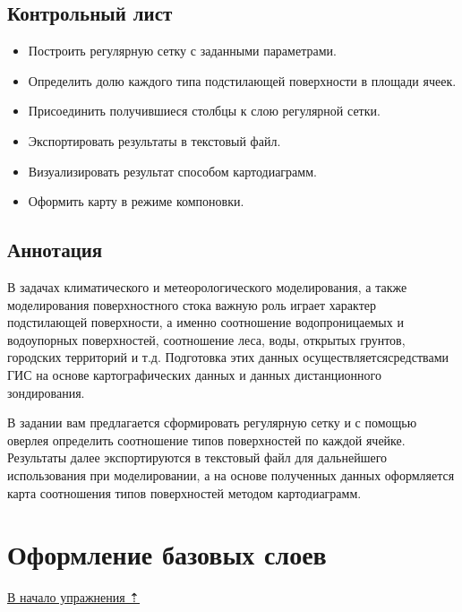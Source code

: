 \documentclass[]{book}
\providecommand{\tightlist}{%
  \setlength{\itemsep}{0pt}\setlength{\parskip}{0pt}}
\theoremstyle{definition}
\theoremstyle{definition}
\theoremstyle{definition}
\theoremstyle{remark}
\begin{document}
\hypertarget{land-cover-hydro-control}{%
\subsection{Контрольный лист}\label{land-cover-hydro-control}}

\begin{itemize}
\tightlist
\item
  Построить регулярную сетку с заданными параметрами.
\item
  Определить долю каждого типа подстилающей поверхности в площади ячеек.
\item
  Присоединить получившиеся столбцы к слою регулярной сетки.
\item
  Экспортировать результаты в текстовый файл.
\item
  Визуализировать результат способом картодиаграмм.
\item
  Оформить карту в режиме компоновки.
\end{itemize}

\hypertarget{land-cover-hydro-annotation}{%
\subsection{Аннотация}\label{land-cover-hydro-annotation}}

В задачах климатического и метеорологического моделирования, а также
моделирования поверхностного стока важную роль играет характер
подстилающей поверхности, а именно соотношение водопроницаемых и
водоупорных поверхностей, соотношение леса, воды, открытых грунтов,
городских территорий и т.д. Подготовка этих данных
осуществляетсясредствами ГИС на основе картографических данных и данных
дистанционного зондирования.

В задании вам предлагается сформировать регулярную сетку и с помощью
оверлея определить соотношение типов поверхностей по каждой ячейке.
Результаты далее экспортируются в текстовый файл для дальнейшего
использования при моделировании, а на основе полученных данных
оформляется карта соотношения типов поверхностей методом картодиаграмм.

\hypertarget{land-cover-hydro-base}{%
\section{Оформление базовых слоев}\label{land-cover-hydro-base}}

\protect\hyperlink{land-cover-hydro}{В начало упражнения ⇡}
\end{document}
